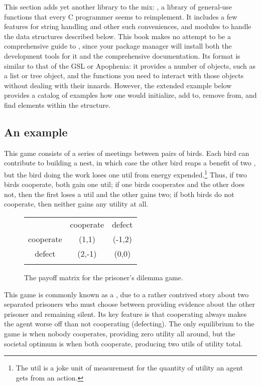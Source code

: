This section adds yet another library to the mix: , a library
of general-use functions that every C programmer seems to reimplement.
It includes a few features for string handling and other such
conveniences, and modules to handle the data structures described below.
This book makes no attempt to be a comprehensive guide to ,
since your package manager will install both the development tools for
it and the comprehensive documentation. Its format is similar to that
of the GSL or Apophenia: it provides a number of objects, such as a list
or tree object, and the functions you need to interact with those
objects without dealing with their innards. However, the extended
example below provides a catalog of examples how one would initialize,
add to, remove from, and find elements within the structure.

\subsection{An example}
This game consists of a series of meetings between pairs of birds. Each
bird can contribute to building a nest, in which case the other bird
reaps a benefit of two , but the bird doing the work
loses one util from energy expended.\footnote{The util is a joke unit of measurement for the quantity of utility an agent gets from an action.}
Thus, if two birds cooperate, both gain one util; if one birds
cooperates and the other does not, then the first loses a util and the
other gains two; if both birds do not cooperate, then neither gains any
utility at all.

\begin{figure}[htb]
\hspace {-0.5cm}
\begin{center}
\begin{tabular}{ccc}
 & cooperate & defect \\
\hhline{~--}
cooperate &\multicolumn{1}{|c}{(1,1)} & \multicolumn{1}{c|}{(-1,2)} \\
defect &\multicolumn{1}{|c}{(2,-1)} &  \multicolumn{1}{c|}{(0,0)} \\
\hhline{~--}
\end{tabular}
\end{center}
\caption{The payoff matrix for the prisoner's dilemma game.}
\label{pdfig}
\end{figure}

This game is commonly known as a , due to a
rather contrived story about two separated prisoners who must choose
between providing evidence about the other prisoner and remaining silent.
Its key feature is that cooperating always makes the agent worse off
than not cooperating (defecting). The only equilibrium to the game is
when nobody cooperates, providing zero utility all around, but the
societal optimum is when both cooperate, producing two utils of utility
total.

